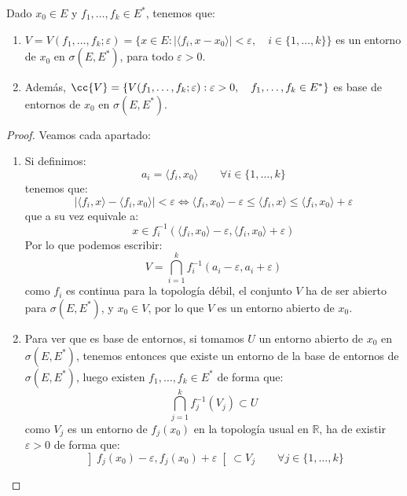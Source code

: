 \begin{prop}
    Dado $x_0\in E$ y $f_1, \ldots, f_k\in E^\ast$, tenemos que:
    \begin{enumerate}
        \item $V = V(f_1, \ldots, f_k;\varepsilon) = \{x\in E : |\langle f_i,x-x_0 \rangle | < \varepsilon, \quad i \in \{1,\ldots, k\}\}$ es un entorno de $x_0$ en $\sigma(E,E^\ast)$, para todo $\varepsilon>0$.
        \item Además, $\cc{V} = \{V(f_1, \ldots, f_k;\varepsilon) : \varepsilon>0, \quad f_1,\ldots,f_k\in E^\ast\}$ es base de entornos de $x_0$ en $\sigma(E,E^\ast)$.
    \end{enumerate}
    \begin{proof}
        Veamos cada apartado:
        \begin{enumerate}
            \item Si definimos:
                \begin{equation*}
                    a_i = \langle f_i ,x_0 \rangle  \qquad \forall i \in \{1,\ldots,k\}
                \end{equation*}
                tenemos que:
                \begin{equation*}
                    |\langle f_i,x \rangle -\langle f_i,x_0 \rangle | < \varepsilon \Longleftrightarrow \langle f_i,x_0 \rangle -\varepsilon\leq \langle f_i,x \rangle \leq \langle f_i,x_0 \rangle  + \varepsilon
                \end{equation*}
                que a su vez equivale a:
                \begin{equation*}
                    x \in f_i^{-1}\left(\langle f_i,x_0 \rangle -\varepsilon,\langle f_i,x_0 \rangle +\varepsilon\right)
                \end{equation*}
                Por lo que podemos escribir:
                \begin{equation*}
                    V = \bigcap_{i = 1}^k f_i^{-1}(a_i - \varepsilon,a_i + \varepsilon)
                \end{equation*}
                como $f_i$ es continua para la topología débil, el conjunto $V$ ha de ser abierto para $\sigma(E,E^\ast)$, y $x_0\in V$, por lo que $V$ es un entorno abierto de $x_0$.
            \item Para ver que es base de entornos, si tomamos $U$ un entorno abierto de $x_0$ en $\sigma(E,E^\ast)$, tenemos entonces que existe un entorno de la base de entornos de $\sigma(E,E^\ast)$, luego existen $f_1, \ldots, f_k\in E^\ast$ de forma que:
                \begin{equation*}
                    \bigcap_{j=1}^k f_j^{-1}(V_j) \subset U
                \end{equation*}
                como $V_j$ es un entorno de $f_j(x_0)$ en la topología usual en $\mathbb{R}$, ha de existir $\varepsilon>0$ de forma que:
                \begin{equation*}
                    \left]f_j(x_0)-\varepsilon,f_j(x_0)+\varepsilon\right[\subset V_j \qquad \forall j \in \{1,\ldots,k\}
                \end{equation*}


\end{enumerate}
\end{proof}
\end{prop}
